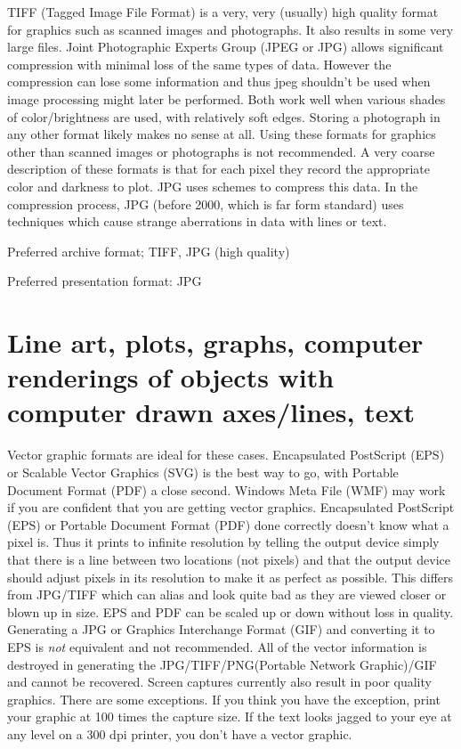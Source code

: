 \documentclass[a4paper]{article}
\begin{document}
TIFF (Tagged Image File Format) is a very, very (usually) high quality format for
graphics such as scanned images and photographs. It also results in some
very large files. Joint Photographic Experts Group (JPEG or JPG) allows
significant compression with minimal loss of the same types of data. However the compression can lose some information and thus jpeg
shouldn’t be used when image processing might later be performed. Both
work well when various shades of color/brightness are used, with
relatively soft edges. Storing a photograph in any other format likely
makes no sense at all. Using these formats for graphics other than
scanned images or photographs is not recommended. A very coarse
description of these formats is that for each pixel they record the
appropriate color and darkness to plot. JPG uses schemes to compress
this data. In the compression process, JPG (before 2000, which is far
form standard) uses techniques which cause strange aberrations in data
with lines or text.
\setcounter{listcnt0}{0}
\begin{list}{.}
{
\setlength{\rightmargin}{\leftmargin}
}

\item Preferred archive format; TIFF, JPG (high quality)

\item Preferred presentation format: JPG
\end{list}


\section{Line art, plots, graphs, computer renderings of objects with computer drawn axes/lines, text%
  \label{line-art-plots-graphs-computer-renderings-of-objects-with-computer-drawn-axes-lines-text}%
}

Vector graphic formats are ideal for these cases. Encapsulated
PostScript (EPS) or Scalable Vector Graphics (SVG) is the best way to
go, with Portable Document
Format (PDF) a close second. Windows Meta File (WMF) may work if you are
confident that you are getting vector graphics. Encapsulated PostScript
(EPS) or Portable Document Format (PDF) done correctly doesn't know what
a pixel is. Thus it prints to infinite resolution by telling the output
device simply that there is a line between two locations (not pixels)
and that the output device should adjust pixels in its resolution to
make it as perfect as possible. This differs from JPG/TIFF which can
alias and look quite bad as they are viewed closer or blown up in size.
EPS and PDF can be scaled up or down without loss in quality. Generating
a JPG or Graphics Interchange Format (GIF) and converting it to EPS is
\emph{not} equivalent and not recommended. All of the vector information is
destroyed in generating the JPG/TIFF/PNG(Portable Network Graphic)/GIF
and cannot be recovered. Screen captures currently also result in poor
quality graphics. There are some exceptions. If you think you have the
exception, print your graphic at 100 times the capture size. If the text
looks jagged to your eye at any level on a 300 dpi printer, you don't
have a vector graphic.
\end{document}
